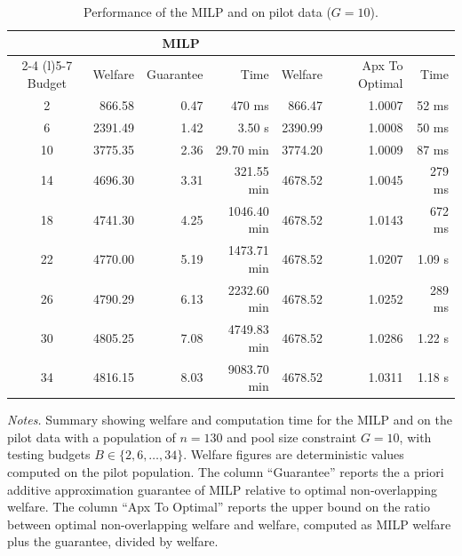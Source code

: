 \begin{table}[tb!]
    \centering
    \begin{threeparttable}
    \caption{Performance of the MILP and \greedy{} on pilot data ($G=10$).}
    \label{table:experiment2}
    {\small
    \renewcommand{\arraystretch}{1.15}
    \begin{tabular}{@{} crrrrrr @{}}
        \toprule
        & \multicolumn{3}{c}{{MILP}} & \multicolumn{3}{c}{{\greedy{}}} \\
        \cmidrule(lr){2-4} \cmidrule(l){5-7}
        {Budget} & Welfare & Guarantee & Time & Welfare & Apx To Optimal & Time \\
        \midrule
        2 & 866.58 & 0.47 & 470 ms & 866.47 & 1.0007 & 52 ms \\
        6 & 2391.49 & 1.42 & 3.50 s & 2390.99 & 1.0008 & 50 ms \\
        10 & 3775.35 & 2.36 & 29.70 min & 3774.20 & 1.0009 & 87 ms \\
        14 & 4696.30 & 3.31 & 321.55 min & 4678.52 & 1.0045 & 279 ms \\
        18 & 4741.30 & 4.25 & 1046.40 min & 4678.52 & 1.0143 & 672 ms \\
        22 & 4770.00 & 5.19 & 1473.71 min & 4678.52 & 1.0207 & 1.09 s \\
        26 & 4790.29 & 6.13 & 2232.60 min & 4678.52 & 1.0252 & 289 ms \\
        30 & 4805.25 & 7.08 & 4749.83 min & 4678.52 & 1.0286 & 1.22 s \\
        34 & 4816.15 & 8.03 & 9083.70 min & 4678.52 & 1.0311 & 1.18 s \\
        \bottomrule
    \end{tabular}
    }
    \begin{tablenotes}[flushleft]
    \footnotesize
    \item[] \emph{Notes.} Summary showing welfare and computation time for the MILP and \greedy{} on the pilot data with a population of $n=130$ and pool size constraint $G=10$, with testing budgets $B \in \{2, 6, \ldots, 34\}$. Welfare figures are deterministic values computed on the pilot population. The column ``Guarantee'' reports the a priori additive approximation guarantee of MILP relative to optimal non-overlapping welfare. The column ``Apx To Optimal'' reports the upper bound on the ratio between optimal non-overlapping welfare and \greedy{} welfare, computed as MILP welfare plus the guarantee, divided by \greedy{} welfare.
    \end{tablenotes}
    \end{threeparttable}
\end{table}
